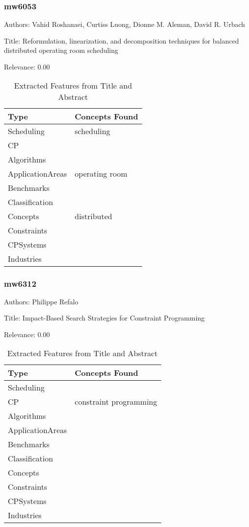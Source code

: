 \subsubsection{mw6053}
\label{mw:mw6053}

Authors: Vahid Roshanaei, Curtiss Luong, Dionne M. Aleman, David R. Urbach

Title: Reformulation, linearization, and decomposition techniques for balanced distributed operating room scheduling

Relevance:  0.00

{\scriptsize
\begin{longtable}{p{2cm}p{20cm}}
\caption{Extracted Features from Title and Abstract}\\ \toprule
Type & Concepts Found\\ \midrule
\endhead
\bottomrule
\endfoot
Scheduling & scheduling\\ 
CP & \\ 
Algorithms & \\ 
ApplicationAreas & operating room\\ 
Benchmarks & \\ 
Classification & \\ 
Concepts & distributed\\ 
Constraints & \\ 
CPSystems & \\ 
Industries & \\ 
\end{longtable}
}



\subsubsection{mw6312}
\label{mw:mw6312}

Authors: Philippe Refalo

Title: Impact-Based Search Strategies for Constraint Programming

Relevance:  0.00

{\scriptsize
\begin{longtable}{p{2cm}p{20cm}}
\caption{Extracted Features from Title and Abstract}\\ \toprule
Type & Concepts Found\\ \midrule
\endhead
\bottomrule
\endfoot
Scheduling & \\ 
CP & constraint programming\\ 
Algorithms & \\ 
ApplicationAreas & \\ 
Benchmarks & \\ 
Classification & \\ 
Concepts & \\ 
Constraints & \\ 
CPSystems & \\ 
Industries & \\ 
\end{longtable}
}



